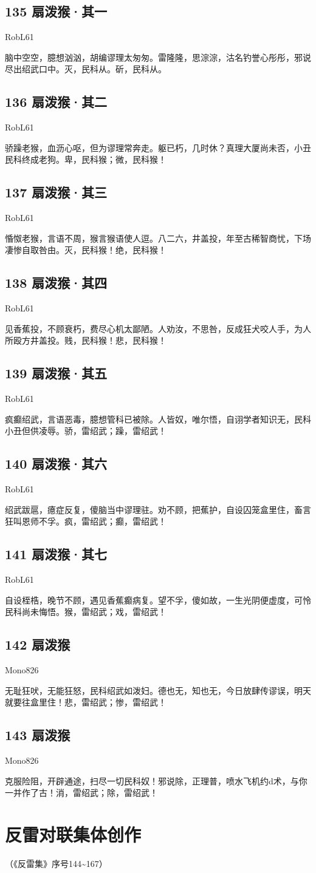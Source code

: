 \documentclass[UTF8,12pt,oneside]{ctexbook}
\def\pau#1{\begin{center} {#1} \end{center}} %
\def\poem#1#2{\section{#1}\pau{#2}} %
\begin{document}
\poem{135 扇泼猴·其一}{RobL61}

脑中空空，臆想汹汹，胡编谬理太匆匆。雷隆隆，思淙淙，沽名钓誉心彤彤，邪说尽出绍武口中。灭，民科从。斫，民科从。

\poem{136 扇泼猴·其二}{RobL61}

骄躁老猴，血沥心呕，但为谬理常奔走。躯已朽，几时休？真理大厦尚未否，小丑民科终成老狗。卑，民科猴；微，民科猴！

\poem{137 扇泼猴·其三}{RobL61}

惛怓老猴，言语不周，猴言猴语使人逗。八二六，井盖投，年至古稀智商忧，下场凄惨自取咎由。灭，民科猴！绝，民科猴！

\newpage

\poem{138 扇泼猴·其四}{RobL61}

见香蕉投，不顾衰朽，费尽心机太鄙陋。人劝汝，不思咎，反成狂犬咬人手，为人所殴方井盖投。贱，民科猴！悲，民科猴！
~\\

\poem{139 扇泼猴·其五}{RobL61}

疯癫绍武，言语恶毒，臆想管科已被除。人皆奴，唯尔悟，自诩学者知识无，民科小丑但供凌辱。骄，雷绍武；躁，雷绍武！
~\\

\poem{140 扇泼猴·其六}{RobL61}

绍武跋扈，癔症反复，傻脑当中谬理驻。劝不顾，把蕉护，自设囚笼盒里住，畜言狂叫恩师不孚。疯，雷绍武；癫，雷绍武！

\newpage

\poem{141 扇泼猴·其七}{RobL61}

自设桎梏，晚节不顾，遇见香蕉癫病复。望不孚，傻如故，一生光阴便虚度，可怜民科尚未悔悟。猴，雷绍武；戏，雷绍武！
~\\

\poem{142 扇泼猴}{Mono826}

无耻狂吠，无能狂怒，民科绍武如泼妇。德也无，知也无，今日放肆传谬误，明天就要往盒里住！悲，雷绍武；惨，雷绍武！
~\\

\poem{143 扇泼猴}{Mono826}

克服险阻，开辟通途，扫尽一切民科奴！邪说除，正理普，喷水飞机约d术，与你一并作了古！消，雷绍武；除，雷绍武！

\chapter{反雷对联集体创作}
\begin{center}
    （《反雷集》序号144\textasciitilde167）
\end{center}
\end{document}
